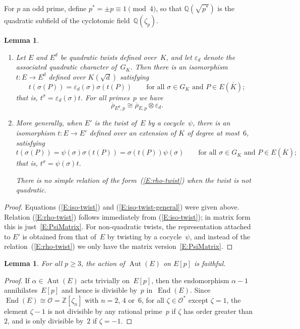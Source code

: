 \documentclass[12pt, reqno]{amsart}
\newcommand{\Q}{\mathbb{Q}}
\newcommand{\Z}{\mathbb{Z}}
\newcommand{\Kbar}{{\overline{K}}}
\newcommand{\rhobar}{{\overline{\rho}}}
\newcommand{\eps}{\varepsilon}
\newcommand{\calO}{\mathcal{O}}
\DeclareMathOperator{\Aut}{Aut}
\DeclareMathOperator{\End}{End}
\numberwithin{equation}{section}
\newtheorem{lemma}[theorem]{Lemma}
\theoremstyle{definition}
\theoremstyle{remark}
\begin{document}
For $p$ an odd prime, define $p^*=\pm p\equiv1\pmod4$, so that
$\Q(\sqrt{p^*})$ is the quadratic subfield of the cyclotomic
field~$\Q(\zeta_p)$.

\begin{lemma}\label{L:twist-rep}
  \begin{enumerate}
    \item
  Let $E$ and $E^d$ be quadratic twists defined over~$K$, and let
  $\eps_d$ denote the associated quadratic character of~$G_K$.  Then
  there is an isomorphism $t :E\to E^d$ defined over $K(\sqrt{d})$
  satisfying
\begin{equation}\label{E:iso-twist}
t (\sigma(P)) = \eps_d(\sigma)\sigma(t (P))\qquad\text{for
  all~$\sigma\in G_K$ and $P\in E(\Kbar)$};
\end{equation}
that is, $t ^{\sigma} = \eps_d(\sigma)t $.  For all primes~$p$ we have
\begin{equation} \label{E:rho-twist}
  \rhobar_{E^d,p} \cong \rhobar_{E,p}\otimes\eps_d.
\end{equation}
\item More generally, when $E'$ is the twist of~$E$ by a
  cocycle~$\psi$, there is an isomorphism $t :E\to E'$ defined
  over an extension of $K$ of degree at most~$6$, satisfying
  \begin{equation}\label{E:iso-twist-general}
t (\sigma(P)) = \psi(\sigma)\sigma(t (P)) =
\sigma(t (P))\psi(\sigma)\qquad\text{for all~$\sigma\in G_K$ and
  $P\in E(\Kbar)$};
  \end{equation}
  that is, $t ^{\sigma} = \psi(\sigma)t $.

  There is no simple relation of the form~(\ref{E:rho-twist}) when the
twist is not quadratic.
  \end{enumerate}

\end{lemma}

\begin{proof}
Equations (\ref{E:iso-twist}) and (\ref{E:iso-twist-general}) were
given above.  Relation (\ref{E:rho-twist}) follows immediately from
(\ref{E:iso-twist}); in matrix form this is just~\eqref{E:PsiMatrix}.
For non-quadratic twists, the representation attached to $E'$ is
obtained from that of~$E$ by twisting by a cocycle~$\psi$, and instead
of the relation~(\ref{E:rho-twist}) we only have the matrix
version~\eqref{E:PsiMatrix}.
\end{proof}

\begin{lemma} \label{L:faithful}
  For all $p\ge3$, the action of $\Aut(E)$ on $E[p]$ is faithful.
\end{lemma}
\begin{proof}
If $\alpha\in\Aut(E)$ acts trivially on~$E[p]$, then the endomorphism
$\alpha-1$ annihilates~$E[p]$ and hence is divisible by~$p$
in~$\End(E)$.  Since $\End(E)\cong\calO=\Z[\zeta_n]$ with $n=2$, $4$
or~$6$, for all $\zeta\in \calO^*$ except $\zeta=1$, the element
$\zeta-1$ is not divisible by any rational prime~$p$ if $\zeta$
has order greater than~$2$, and is only divisible by~$2$ if
$\zeta=-1$.
\end{proof}
\end{document}
